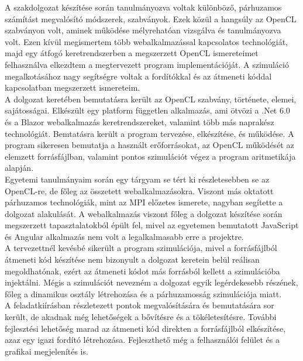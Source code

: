 
A szakdolgozat készítése során tanulmányozva voltak különböző, párhuzamos számítást megvalósító módszerek, szabványok. Ezek közül a hangsúly az OpenCL szabványon volt, aminek működése mélyrehatóan vizsgálva és tanulmányozva volt. Ezen kívül megismertem több webalkalmazással kapcsolatos technológiát, majd egy átfogó keretrendszerben a megszerzett OpenCL ismereteimet felhasználva elkezdtem a megtervezett program implementációját. A szimuláció megalkotásához nagy segítségre voltak a fordítókkal és az átmeneti kóddal kapcsolatban megszerzett ismereteim. \\

A dolgozat keretében bemutatásra került az OpenCL szabvány, története, elemei, sajátosságai.
Elkészült egy platform független alkalmazás, ami ötvözi a .Net 6.0 és a Blazor webalkalmazás keretrendszereket, valamint több más naprakész technológiát. Bemtatásra került a program tervezése, elkészítése, és működése. A program sikeresen bemutatja a használt erőforrásokat, az OpenCL működését az elemzett forrásfájlban, valamint pontos szimulációt végez a program aritmetikája alapján.\\

Egyetemi tanulmányaim során egy tárgyam se tért ki részletesebben se az OpenCL-re, de főleg az összetett webalkalmazásokra. Viszont más oktatott párhuzamos technológiák, mint az MPI előzetes ismerete, nagyban segítette a dolgozat alakulását. A webalkalmazás viszont főleg a dolgozat készítése során megszerzett tapasztalatokból épült fel, mivel az egyetemen bemutatott JavaScript és Angular\cite{angular} alkalmazás nem volt a legalkalmasabb erre a projektre. \\

A tervezettnél kevésbé sikerült a program szimulációja, mivel a forrásfájlból átmeneti kód készítése nem bizonyult a dolgozat keretein belül reálisan megoldhatónak, ezért az átmeneti kódot más forrásból kellett a szimulációba injektálni. Mégis a szimulációt nevezném a dolgozat egyik legérdekesebb részének, főleg a dinamikus osztály létrehozása és a párhuzamosság szimulációja miatt.\\

A feladatkiírásban részletezett pontok megvalósítására és bemutatására sor került, de akadnak még lehetőségek a bővítésre és a tökéletesítésre. További fejlesztési lehetőség marad az átmeneti kód direkten a forrásfájlból elkészítése, azaz egy igazi fordító létrehozása. Fejleszthető még a felhasználói felület és a grafikai megjelenítés is.\\

